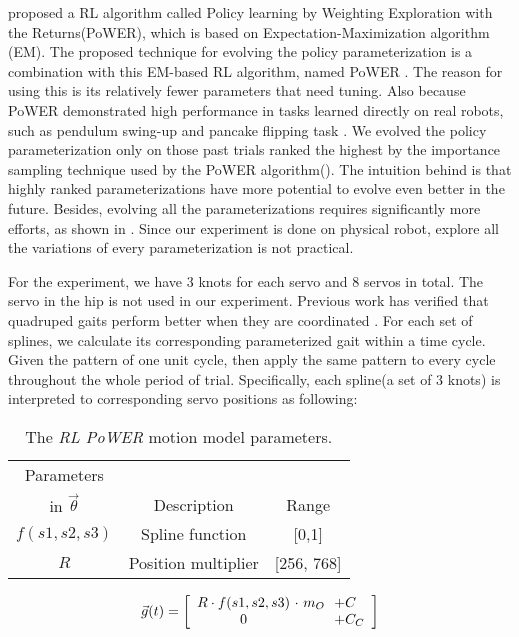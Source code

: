 \cite{kober2009learning-motor-primitives} proposed a RL algorithm
called Policy learning by Weighting Exploration with the
Returns(PoWER), which is based on Expectation-Maximization algorithm
(EM). The proposed technique for evolving the policy parameterization
is a combination with this EM-based RL algorithm, named PoWER \cite{kober2009learning-motor-primitives}. The reason for using this is its relatively fewer parameters that need tuning. Also because PoWER
demonstrated high performance in tasks learned directly on real
robots, such as pendulum swing-up and pancake flipping task \cite{kormushev2010robot-motor-skill}. We
evolved the policy parameterization only on those past trials ranked
the highest by the importance sampling technique used by the PoWER
algorithm(). The intuition behind is that highly ranked
parameterizations have more potential to evolve even better in the
future. Besides, evolving all the parameterizations requires
significantly more efforts, as shown in \cite{bongard2006resilient-machines-through}. Since our experiment
is done on physical robot, explore all the variations of every
parameterization is not practical. 

For the experiment, we have 3 knots for each servo and 8
servos in total. The servo in the hip is not used in
our experiment. Previous work has verified that quadruped gaits
perform better when they are coordinated \cite{clune2009evolving-coordinated-quadruped} \cite{clune2011on-the-performance-of-indirect-encoding}
\cite{valsalam2008modular-neuroevolution-for-multilegged}. For each set of
splines, we calculate its corresponding parameterized gait within a
time cycle. Given the pattern of one unit cycle, then apply the same
pattern to every cycle throughout the whole period of
trial. Specifically, each spline(a set of 3 knots) is interpreted to corresponding servo positions as
following:

\begin{table}[b]
\begin{center}
\begin{tabular}{|c|c|c|}
\hline
Parameters        &                           &       \\
in $\vec{\theta}$ & Description               & Range \\
\hline
\hline
$f(s1,s2,s3)$        & Spline function           & [0,1] \\  %
\hline
$R$          & Position multiplier                & [256, 768] \\
\hline
\end{tabular}
\caption{The \emph{RL PoWER} motion model parameters.}
\label{tab:params}
\end{center}
\end{table}


\[
\vec{g}(t) =
\left[ {\begin{array}{c@{ }c@{ }c@{ }l@{ }l}
R \cdot f(s1, s2, s3) & \ \cdot \ m_O         & \             & \            & + C \\ %
0                              & \             & \             & \            & + C_C \\ %
\end{array} } \right]
\]




